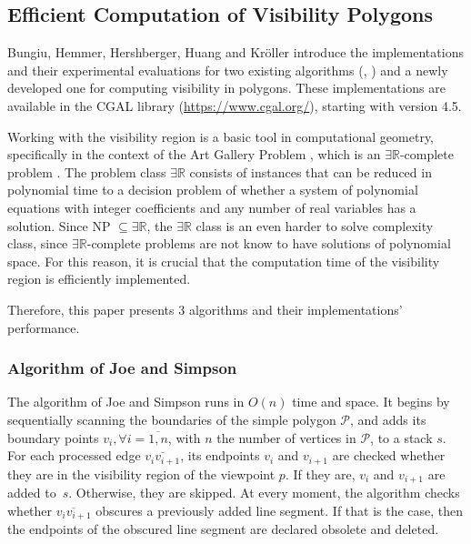 \subsection{Efficient Computation of Visibility Polygons \cite{DBLP:journals/corr/BungiuHHHK14}}
Bungiu, Hemmer, Hershberger, Huang and Kr\"oller  \cite{DBLP:journals/corr/BungiuHHHK14} introduce the implementations and their experimental evaluations for two existing algorithms (\cite{joe1987corrections}, \cite{asano1985efficient}) and a newly developed one for computing visibility in polygons. These implementations are available in the CGAL library (\url{https://www.cgal.org/}), starting with version 4.5.

Working with the visibility region is a basic tool in computational geometry, specifically in the context of the Art Gallery Problem \cite{o1987art}, which is an $\exists \mathbb R$-complete problem \cite{abrahamsen2021art}. The problem class $\exists \mathbb R$ consists of instances that can be reduced in polynomial time to a decision problem of whether a system of polynomial equations with integer coefficients and any number of real variables has a solution. Since NP $\subseteq \exists \mathbb R$, the $\exists \mathbb R$ class is an even harder to solve complexity class, since $\exists \mathbb R$-complete problems are not know to have solutions of polynomial space. For this reason, it is crucial that the computation time of the visibility region is efficiently implemented. 

Therefore, this paper presents 3 algorithms and their implementations' performance.

\subsubsection{Algorithm of Joe and Simpson \cite{joe1987corrections}}
The algorithm of Joe and Simpson \cite{joe1987corrections} runs in $O(n)$ time and space. It begins by sequentially scanning the boundaries of the simple polygon $\mathcal P$, and adds its boundary points $v_i, \forall i = \overline{1, n}$, with $n$ the number of vertices in $\mathcal P$, to a stack $s$. For each processed edge $\overline{v_iv_{i + 1}}$, its endpoints $v_i$ and $v_{i + 1}$ are checked whether they are in the visibility region of the viewpoint $p$. If they are, $v_i$ and $v_{i + 1}$ are added to~$s$. Otherwise, they are skipped. At every moment, the algorithm checks whether $\overline{v_iv_{i + 1}}$ obscures a previously added line segment. If that is the case, then the endpoints of the obscured line segment are declared obsolete and deleted. 

